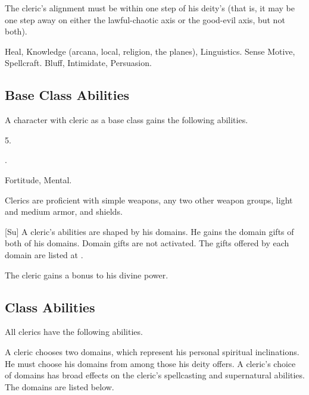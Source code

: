      The cleric's alignment must be within one step of his deity's (that is, it may be one step away on either the lawful-chaotic axis or the good-evil axis, but not both).

     Heal, Knowledge (arcana, local, religion, the planes), Linguistics.
     Sense Motive, Spellcraft.
     Bluff, Intimidate, Persuasion.

    \subsection{Base Class Abilities}
        A character with cleric as a base class gains the following abilities.

         5.

         .

          Fortitude,  Mental.

        Clerics are proficient with simple weapons, any two other weapon groups, light and medium armor, and shields.

        [Su]
        A cleric's abilities are shaped by his domains.
        He gains the domain gifts of both of his domains.
        Domain gifts are not activated.
        The gifts offered by each domain are listed at .

        The cleric gains a  bonus to his divine power.

    \subsection{Class Abilities}
        All clerics have the following abilities.

        A cleric chooses two domains, which represent his personal spiritual inclinations.
        He must choose his domains from among those his deity offers.
        A cleric's choice of domains has broad effects on the cleric's spellcasting and supernatural abilities.
        The domains are listed below.

